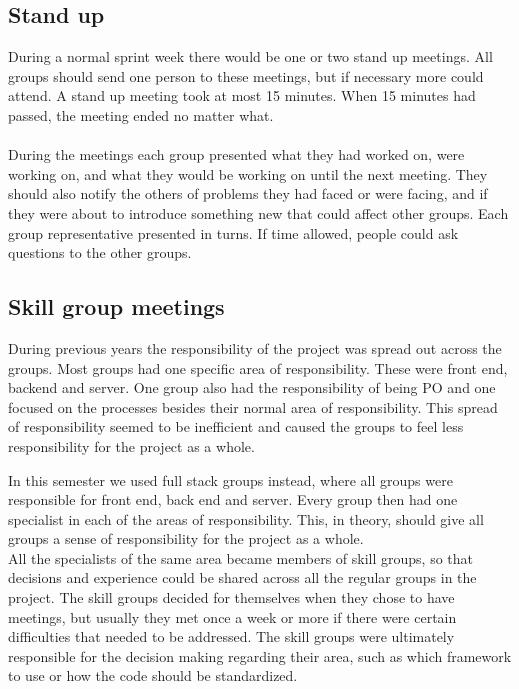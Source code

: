 \subsection{Stand up}
During a normal sprint week there would be one or two stand up meetings.
All groups should send one person to these meetings, but if necessary more could attend.
A stand up meeting took at most 15 minutes.
When 15 minutes had passed, the meeting ended no matter what.
\\
\\
During the meetings each group presented what they had worked on, were working on, and what they would be working on until the next meeting.
They should also notify the others of problems they had faced or were facing, and if they were about to introduce something new that could affect other groups.
Each group representative presented in turns. 
If time allowed, people could ask questions to the other groups.

\subsection{Skill group meetings}
During previous years the responsibility of the project was spread out across the groups.
Most groups had one specific area of responsibility.
These were front end, backend and server.
One group also had the responsibility of being PO and one focused on the processes besides their normal area of responsibility.
This spread of responsibility seemed to be inefficient and caused the groups to feel less responsibility for the project as a whole.
\newline
\newline

In this semester we used full stack groups instead, where all groups were responsible for front end, back end and server.
Every group then had one specialist in each of the areas of responsibility.
This, in theory, should give all groups a sense of responsibility for the project as a whole.\\
All the specialists of the same area became members of skill groups, so that decisions and experience could be shared across all the regular groups in the project.
The skill groups decided for themselves when they chose to have meetings, but usually they met once a week or more if there were certain difficulties that needed to be addressed.
The skill groups were ultimately responsible for the decision making regarding their area, such as which framework to use or how the code should be standardized.

